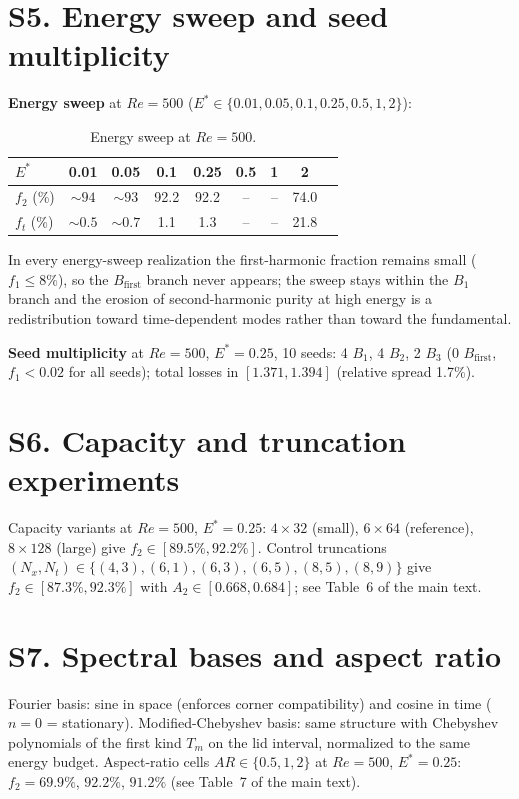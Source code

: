 \documentclass[11pt]{article}
\begin{document}
\section{S5. Energy sweep and seed multiplicity}
\label{sec:S5}

\textbf{Energy sweep} at $Re=500$ ($E^*\in\{0.01,0.05,0.1,0.25,0.5,1,2\}$):

\begin{table}[h]
\centering\small
\caption{Energy sweep at $Re=500$.}
\label{tab:S5a}
\begin{tabular}{lcccccccc}
\toprule
$E^*$ & 0.01 & 0.05 & 0.1 & 0.25 & 0.5 & 1 & 2\\
\midrule
$f_2$ (\%) & $\sim94$ & $\sim93$ & 92.2 & 92.2 & -- & -- & 74.0\\
$f_t$ (\%) & $\sim0.5$ & $\sim0.7$ & 1.1 & 1.3 & -- & -- & 21.8\\
\bottomrule
\end{tabular}
\end{table}

In every energy-sweep realization the first-harmonic fraction remains small
($f_1\le8\%$), so the $B_{\mathrm{first}}$ branch never appears; the sweep stays
within the $B_1$ branch and the erosion of second-harmonic purity at high energy is
a redistribution toward time-dependent modes rather than toward the fundamental.

\textbf{Seed multiplicity} at $Re=500$, $E^*=0.25$, 10 seeds: 4 $B_1$,
4 $B_2$, 2 $B_3$ (0 $B_{\mathrm{first}}$, $f_1<0.02$ for all seeds); total losses
in $[1.371,1.394]$ (relative spread 1.7\%).

\section{S6. Capacity and truncation experiments}
\label{sec:S6}

Capacity variants at $Re=500$, $E^*=0.25$: $4\times32$ (small),
$6\times64$ (reference), $8\times128$ (large) give
$f_2\in[89.5\%,92.2\%]$. Control truncations
$(N_x,N_t)\in\{(4,3),(6,1),(6,3),(6,5),(8,5),(8,9)\}$ give
$f_2\in[87.3\%,92.3\%]$ with $A_2\in[0.668,0.684]$; see Table~6 of the main
text.

\section{S7. Spectral bases and aspect ratio}
\label{sec:S7}

Fourier basis: sine in space (enforces corner compatibility) and cosine in
time ($n=0$ = stationary). Modified-Chebyshev basis: same structure with
Chebyshev polynomials of the first kind $T_m$ on the lid interval, normalized
to the same energy budget. Aspect-ratio cells $AR\in\{0.5,1,2\}$ at
$Re=500$, $E^*=0.25$: $f_2=69.9\%$, $92.2\%$, $91.2\%$ (see Table~7 of the
main text).
\end{document}
